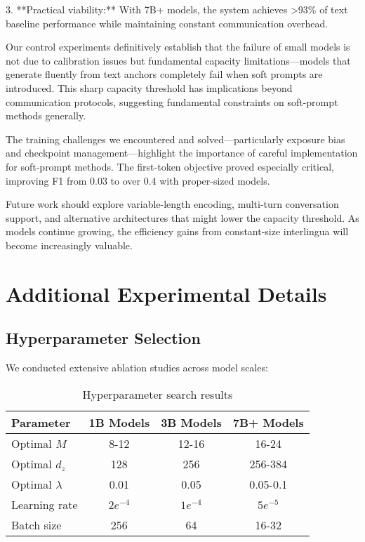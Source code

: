 \documentclass{article}
\begin{document}
3. **Practical viability:** With 7B+ models, the system achieves >93\% of text baseline performance while maintaining constant communication overhead.

Our control experiments definitively establish that the failure of small models is not due to calibration issues but fundamental capacity limitations—models that generate fluently from text anchors completely fail when soft prompts are introduced. This sharp capacity threshold has implications beyond communication protocols, suggesting fundamental constraints on soft-prompt methods generally.

The training challenges we encountered and solved—particularly exposure bias and checkpoint management—highlight the importance of careful implementation for soft-prompt methods. The first-token objective proved especially critical, improving F1 from 0.03 to over 0.4 with proper-sized models.

Future work should explore variable-length encoding, multi-turn conversation support, and alternative architectures that might lower the capacity threshold. As models continue growing, the efficiency gains from constant-size interlingua will become increasingly valuable.




\appendix
\section{Additional Experimental Details}

\subsection{Hyperparameter Selection}

We conducted extensive ablation studies across model scales:

\begin{table}[h]
\caption{Hyperparameter search results}
\vskip 0.15in
\begin{center}
\begin{small}
\begin{tabular}{lccc}
\toprule
Parameter & 1B Models & 3B Models & 7B+ Models \\
\midrule
Optimal $M$ & 8-12 & 12-16 & 16-24 \\
Optimal $d_z$ & 128 & 256 & 256-384 \\
Optimal $\lambda$ & 0.01 & 0.05 & 0.05-0.1 \\
Learning rate & $2e^{-4}$ & $1e^{-4}$ & $5e^{-5}$ \\
Batch size & 256 & 64 & 16-32 \\
\bottomrule
\end{tabular}
\end{small}
\end{center}
\end{table}
\end{document}
